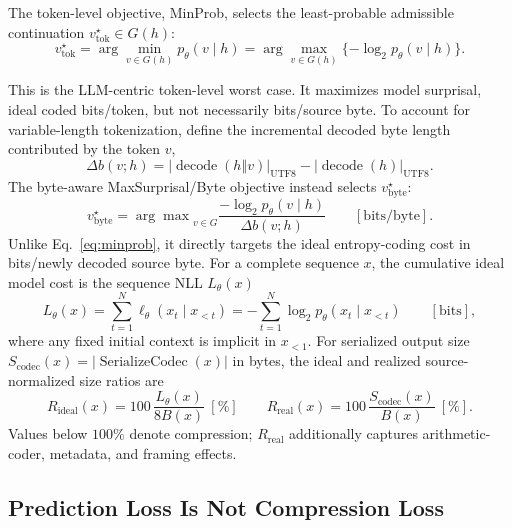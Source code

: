 \documentclass{article}
\newcommand{\bytes}[1]{\lvert #1\rvert_{\mathrm{UTF8}}}
\newcommand{\vtok}{v^\star_{\mathrm{tok}}}
\newcommand{\vbyte}{v^\star_{\mathrm{byte}}}
\newcommand{\Ser}{\operatorname{SerializeCodec}}
\begin{document}

The token-level objective, MinProb, selects the least-probable admissible continuation $\vtok \in G(h)$:
\begin{equation}
  \vtok
  = \arg\min_{v\in G(h)} p_\theta(v\mid h)
  = \arg\max_{v\in G(h)}
    \{-\log_2 p_\theta(v\mid h)\}.
  \label{eq:minprob}
\end{equation}

This is the LLM-centric token-level worst case. It maximizes model surprisal, ideal coded bits/token, but not necessarily bits/source byte. To account for variable-length tokenization, define the incremental decoded byte length contributed by the token $v$,
\begin{equation}
  \Delta b(v;h)=
  \bytes{\operatorname{decode}(h\mathbin\Vert v)}-
  \bytes{\operatorname{decode}(h)}.
\end{equation}
The byte-aware MaxSurprisal/Byte objective instead selects $\vbyte$:
\begin{equation}
  \vbyte = {\arg \max}_{v\in G}
  \frac{-\log_2 p_\theta(v\mid h)}{\Delta b(v;h)}  \qquad [\mathrm{bits/byte}].
  \label{eq:spb}
\end{equation}
Unlike Eq.~\ref{eq:minprob}, it directly targets the ideal entropy-coding cost in bits/newly decoded source byte.
For a complete sequence $x$, the cumulative ideal model cost is the sequence NLL $L_\theta(x)$
\begin{equation}
  L_\theta(x)
  =
  \sum_{t=1}^{N}
  \ell_\theta(x_t\mid x_{<t})
  =
  -\sum_{t=1}^{N}\log_2 p_\theta(x_t\mid x_{<t})
  \qquad [\mathrm{bits}],
  \label{eq:nll}
\end{equation}
where any fixed initial context is implicit in $x_{<1}$. For serialized output
size $S_{\mathrm{codec}}(x)=\left|\Ser(x)\right|$ in bytes, the ideal and
realized source-normalized size ratios are
\begin{equation}
  R_{\mathrm{ideal}}(x)=100\,\frac{L_\theta(x)}{8B(x)}\ [\%]
  \qquad
  R_{\mathrm{real}}(x)=100\,\frac{S_{\mathrm{codec}}(x)}{B(x)}\ [\%].
  \label{eq:size-ratios}
\end{equation}
Values below $100\%$ denote compression; $R_{\mathrm{real}}$ additionally
captures arithmetic-coder, metadata, and framing effects.

\subsection{Prediction Loss Is Not Compression Loss}
\label{sec:objective-mismatch}
\end{document}

